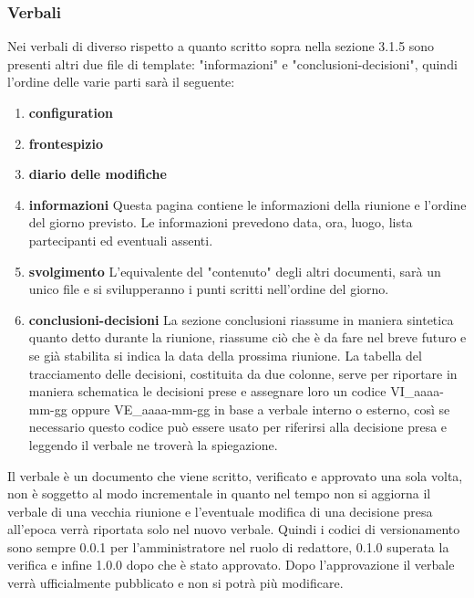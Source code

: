 \subsubsection{Verbali}
Nei verbali di diverso rispetto a quanto scritto sopra nella sezione 3.1.5 
sono presenti altri due file di template: "informazioni" e "conclusioni-decisioni", 
quindi l'ordine delle varie parti sarà il seguente:
\begin{enumerate}
        \item \textbf{configuration}
        \item \textbf{frontespizio}
        \item \textbf{diario delle modifiche}
        \item \textbf{informazioni}
                Questa pagina contiene le informazioni della riunione e l'ordine del giorno previsto.
                Le informazioni prevedono data, ora, luogo, lista partecipanti ed eventuali assenti.
        \item \textbf{svolgimento}
                L'equivalente del "contenuto" degli altri documenti, sarà un unico file e si 
                svilupperanno i punti scritti nell'ordine del giorno.
        \item \textbf{conclusioni-decisioni}
                La sezione conclusioni riassume in maniera sintetica quanto detto durante la riunione, 
                riassume ciò che è da fare nel breve futuro e se già stabilita si indica la data 
                della prossima riunione. \newline
                La tabella del tracciamento delle decisioni, costituita da due colonne, serve per 
                riportare in maniera schematica le decisioni prese e assegnare loro un codice 
                VI\_aaaa-mm-gg oppure VE\_aaaa-mm-gg in base a verbale interno o esterno, così 
                se necessario questo codice può essere usato per riferirsi alla decisione presa 
                e leggendo il verbale ne troverà la spiegazione.
\end{enumerate}
Il verbale è un documento che viene scritto, verificato e approvato una sola volta, 
non è soggetto al modo incrementale in quanto nel tempo non si aggiorna il verbale 
di una vecchia riunione e l'eventuale modifica di una decisione presa all'epoca verrà 
riportata solo nel nuovo verbale. Quindi i codici di versionamento sono sempre 0.0.1 
per l'amministratore nel ruolo di redattore, 0.1.0 superata la verifica e infine 1.0.0 
dopo che è stato approvato. Dopo l'approvazione il verbale verrà ufficialmente pubblicato 
e non si potrà più modificare.